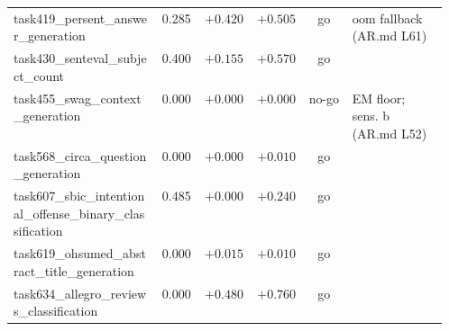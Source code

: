 \begin{longtable}{@{}p{0.34\linewidth}rrrcp{0.22\linewidth}@{}}
\scriptsize task419\_\hspace{0pt}persent\_\hspace{0pt}answer\_\hspace{0pt}generation & \scriptsize 0.285 & \scriptsize $+0.420$ & \scriptsize $+0.505$ & \scriptsize go & \scriptsize oom fallback (AR.md L61) \\
\scriptsize task430\_\hspace{0pt}senteval\_\hspace{0pt}subject\_\hspace{0pt}count & \scriptsize 0.400 & \scriptsize $+0.155$ & \scriptsize $+0.570$ & \scriptsize go & \scriptsize  \\
\scriptsize task455\_\hspace{0pt}swag\_\hspace{0pt}context\_\hspace{0pt}generation & \scriptsize 0.000 & \scriptsize $+0.000$ & \scriptsize $+0.000$ & \scriptsize no-go & \scriptsize EM floor; sens. b (AR.md L52) \\
\scriptsize task568\_\hspace{0pt}circa\_\hspace{0pt}question\_\hspace{0pt}generation & \scriptsize 0.000 & \scriptsize $+0.000$ & \scriptsize $+0.010$ & \scriptsize go & \scriptsize  \\
\scriptsize task607\_\hspace{0pt}sbic\_\hspace{0pt}intentional\_\hspace{0pt}offense\_\hspace{0pt}binary\_\hspace{0pt}classification & \scriptsize 0.485 & \scriptsize $+0.000$ & \scriptsize $+0.240$ & \scriptsize go & \scriptsize  \\
\scriptsize task619\_\hspace{0pt}ohsumed\_\hspace{0pt}abstract\_\hspace{0pt}title\_\hspace{0pt}generation & \scriptsize 0.000 & \scriptsize $+0.015$ & \scriptsize $+0.010$ & \scriptsize go & \scriptsize  \\
\scriptsize task634\_\hspace{0pt}allegro\_\hspace{0pt}reviews\_\hspace{0pt}classification & \scriptsize 0.000 & \scriptsize $+0.480$ & \scriptsize $+0.760$ & \scriptsize go & \scriptsize  \\

\end{longtable}
